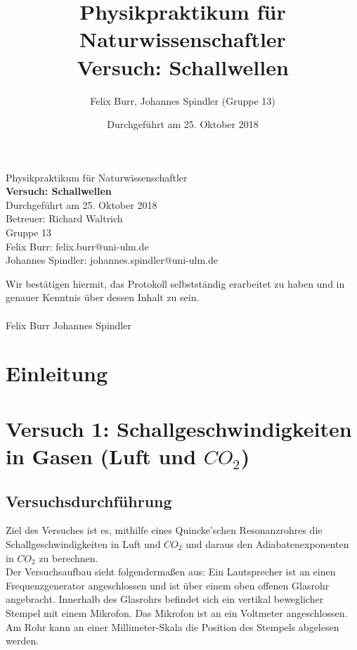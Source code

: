 \documentclass{scrartcl}
\title{Physikpraktikum für Naturwissenschaftler \\ Versuch: Schallwellen}
\author{Felix Burr, Johannes Spindler (Gruppe 13)}
\date{Durchgeführt am 25. Oktober 2018}
\begin{document}
\begin{titlepage}
  \begin{center}
    \vspace*{1cm}
    \LARGE
    Physikpraktikum für Naturwissenschaftler \\
    \vspace*{1cm}
    \Huge
    \textbf{Versuch: Schallwellen} \\
    \vspace*{0.3cm}
    \Large
    Durchgeführt am 25. Oktober 2018 \\
    Betreuer: Richard Waltrich \\
    \vspace*{2.5cm}
    Gruppe 13 \\
    Felix Burr: felix.burr@uni-ulm.de \\
    Johannes Spindler: johannes.spindler@uni-ulm.de \\
    \vfill 
  \end{center}
  Wir bestätigen hiermit, das Protokoll selbstständig erarbeitet zu haben und in genauer Kenntnis über dessen Inhalt zu sein. \\
  \vspace*{0.8cm}
  \\
  Felix Burr
  \hfill
  Johannes Spindler
\end{titlepage}
\pagebreak
\tableofcontents


\pagebreak

\section{Einleitung}

\section{Versuch 1: Schallgeschwindigkeiten in Gasen (Luft und $CO_{2}$)}
\subsection{Versuchsdurchführung}
Ziel des Versuches ist es, mithilfe eines Quincke'schen Resonanzrohres die Schallgeschwindigkeiten in Luft und $CO_{2}$ und daraus den Adiabatenexponenten in $CO_{2}$ zu berechnen.
\\

Der Versuchsaufbau sieht folgendermaßen aus: Ein Lautsprecher ist an einen Frequenzgenerator angeschlossen und ist über einem oben offenen Glasrohr angebracht. Innerhalb des Glasrohrs befindet sich ein vertikal beweglicher Stempel mit einem Mikrofon. Das Mikrofon ist an ein Voltmeter angeschlossen. Am Rohr kann an einer Millimeter-Skala die Position des Stempels abgelesen werden.
\end{document}
